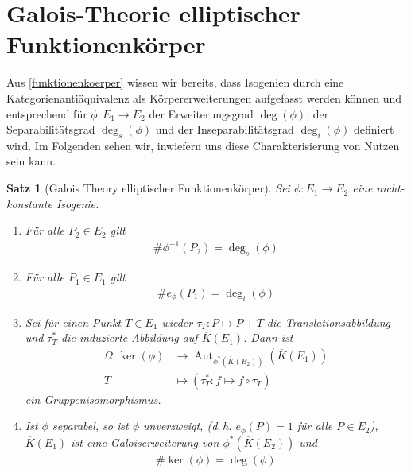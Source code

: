\documentclass[english, german, parskip=half]{scrartcl}
\newtheorem{Satz}{Satz}[section]
\theoremstyle{definition}
\theoremstyle{remark}
\newcommand*{\algK}{\ensuremath{\overline K}} %
\newcommand*{\longto}{\longrightarrow}
\newcommand*{\degs}{\operatorname{\deg}_s} %
\newcommand*{\degi}{\operatorname{\deg}_i} %
\DeclareMathOperator{\Aut}{Aut}
\begin{document}

\section{Galois-Theorie elliptischer Funktionenkörper}
Aus \autoref{funktionenkoerper} wissen wir bereits, dass Isogenien
durch eine Kategorienantiäquivalenz als Körpererweiterungen aufgefasst
werden können und entsprechend für $\phi\colon E_1\to E_2$ der
Erweiterungsgrad $\deg(\phi)$, der Separabilitätsgrad $\degs(\phi)$
und der Inseparabilitätsgrad $\degi(\phi)$ definiert wird.
Im Folgenden sehen wir, inwiefern uns diese Charakterisierung von
Nutzen sein kann.

\begin{Satz}[Galois Theory elliptischer Funktionenkörper]\label{galois}
  Sei $\phi\colon E_1\to E_2$ eine nicht-konstante Isogenie.
  \begin{enumerate}[label=\roman*)]
  \item Für alle $P_2\in E_2$ gilt
    \begin{gather*}
      \#\phi^{-1}(P_2) = \degs(\phi)
    \end{gather*}
  \item Für alle $P_1\in E_1$ gilt
    \begin{gather*}
      \#e_{\phi}(P_1) = \degi(\phi)
    \end{gather*}
  \item Sei für einen Punkt $T\in E_1$ wieder 
    $\tau_T\colon P\mapsto P+T$ die Translationsabbildung und 
    $\tau_T^*$ die induzierte Abbildung auf $\algK(E_1)$.
    Dann ist
    \begin{align*}
      \Omega\colon
      \ker(\phi) 
      &\longto \Aut_{\phi^*(\algK(E_2))}\left( \algK(E_1) \right) \\
      T 
      &\longmapsto \left( \tau_T^* \colon f\mapsto f\circ \tau_T \right)
    \end{align*}
    ein Gruppenisomorphismus.
  \item Ist $\phi$ separabel, 
    so ist $\phi$ unverzweigt,
    (d.\,h. $e_\phi(P)=1$ für alle $P\in E_2$),
    $\algK(E_1)$ ist eine Galoiserweiterung von $\phi^*(\algK(E_2))$
    und
    \begin{gather*}
      \#\ker(\phi) = \deg(\phi)
    \end{gather*}

  \end{enumerate}


\end{Satz}
\end{document}
